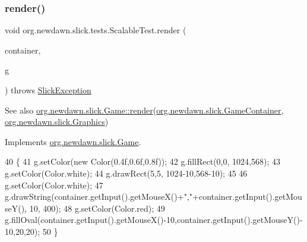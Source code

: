 \subsubsection{\texorpdfstring{render()}{render()}}
{\footnotesize\ttfamily void org.\+newdawn.\+slick.\+tests.\+Scalable\+Test.\+render (\begin{DoxyParamCaption}\item[{\mbox{\hyperlink{classorg_1_1newdawn_1_1slick_1_1_game_container}{Game\+Container}}}]{container,  }\item[{\mbox{\hyperlink{classorg_1_1newdawn_1_1slick_1_1_graphics}{Graphics}}}]{g }\end{DoxyParamCaption}) throws \mbox{\hyperlink{classorg_1_1newdawn_1_1slick_1_1_slick_exception}{Slick\+Exception}}\hspace{0.3cm}{\ttfamily [inline]}}

\begin{DoxySeeAlso}{See also}
\mbox{\hyperlink{interfaceorg_1_1newdawn_1_1slick_1_1_game_af1a4670d43eb3ba04dfcf55ab1975b64}{org.\+newdawn.\+slick.\+Game\+::render}}(\mbox{\hyperlink{classorg_1_1newdawn_1_1slick_1_1_game_container}{org.\+newdawn.\+slick.\+Game\+Container}}, \mbox{\hyperlink{classorg_1_1newdawn_1_1slick_1_1_graphics}{org.\+newdawn.\+slick.\+Graphics}}) 
\end{DoxySeeAlso}


Implements \mbox{\hyperlink{interfaceorg_1_1newdawn_1_1slick_1_1_game_af1a4670d43eb3ba04dfcf55ab1975b64}{org.\+newdawn.\+slick.\+Game}}.


\begin{DoxyCode}
40                                                                                   \{
41         g.setColor(\textcolor{keyword}{new} Color(0.4f,0.6f,0.8f));
42         g.fillRect(0,0, 1024,568);
43         g.setColor(Color.white);
44         g.drawRect(5,5, 1024-10,568-10);
45         
46         g.setColor(Color.white);
47         g.drawString(container.getInput().getMouseX()+\textcolor{stringliteral}{","}+container.getInput().getMouseY(), 10, 400);
48         g.setColor(Color.red);
49         g.fillOval(container.getInput().getMouseX()-10,container.getInput().getMouseY()-10,20,20);
50     \}
\end{DoxyCode}
\mbox{\label{classorg_1_1newdawn_1_1slick_1_1tests_1_1_scalable_test_a2184ee570246755838d5a754328d1e1a}} 
